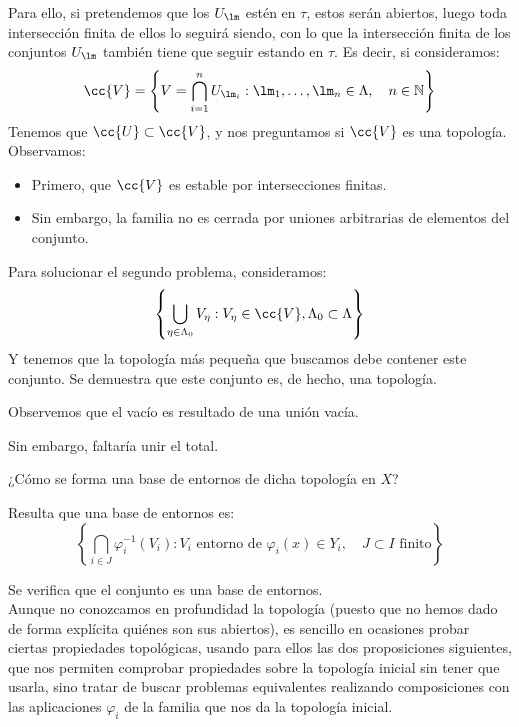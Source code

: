 \noindent
Para ello, si pretendemos que los $U_\lm$ estén en $\tau$, estos serán abiertos, luego toda intersección finita de ellos lo seguirá siendo, con lo que la intersección finita de los conjuntos $U_\lm$ también tiene que seguir estando en $\tau$. Es decir, si consideramos:
\begin{equation*}
    \cc{V} = \left\{V = \bigcap_{i=1}^n U_{\lm _i} : \lm_1, \ldots, \lm_n \in \Lambda, \quad n\in \mathbb{N}\right\}
\end{equation*}
Tenemos que $\cc{U}\subset \cc{V}$, y nos preguntamos si $\cc{V}$ es una topología. Observamos:
\begin{itemize}
    \item Primero, que $\cc{V}$ es estable por intersecciones finitas.
    \item Sin embargo, la familia no es cerrada por uniones arbitrarias de elementos del conjunto.
\end{itemize}
Para solucionar el segundo problema, consideramos:
\begin{equation*}
    \left\{\bigcup_{\eta \in \Lambda_0} V_\eta : V_\eta \in \cc{V}, \Lambda_0\subset \Lambda\right\}
\end{equation*}
Y tenemos que la topología más pequeña que buscamos debe contener este conjunto. Se demuestra que este conjunto es, de hecho, una topología.

\begin{observacion}
    Observemos que el vacío es resultado de una unión vacía.

    Sin embargo, faltaría unir el total.
\end{observacion}

\noindent
¿Cómo se forma una base de entornos de dicha topología en $X$?

Resulta que una base de entornos es:
\begin{equation*}
    \left\{\bigcap_{i \in J}\varphi_i^{-1}(V_i) : V_i \text{\ entorno de\ } \varphi_i(x)\in Y_i, \quad J\subset I \text{\ finito}\right\}
\end{equation*}

\noindent
Se verifica que el conjunto es una base de entornos.\\

\noindent
Aunque no conozcamos en profundidad la topología (puesto que no hemos dado de forma explícita quiénes son sus abiertos), es sencillo en ocasiones probar ciertas propiedades topológicas, usando para ellos las dos proposiciones siguientes, que nos permiten comprobar propiedades sobre la topología inicial sin tener que usarla, sino tratar de buscar problemas equivalentes realizando composiciones con las aplicaciones $\varphi_i$ de la familia que nos da la topología inicial.

